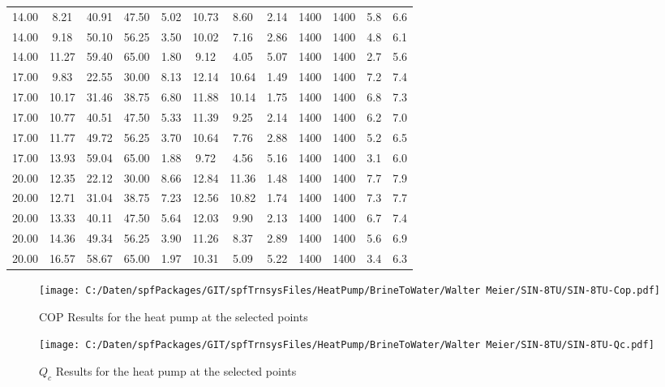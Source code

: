 \documentclass[english]{SPFShortReport}
\begin{document}
\begin{table}[!ht]
\begin{small}
\begin{center}
{\begin{tabular}{l | c c c c c c c c c c c }
14.00 & 8.21 & 40.91 & 47.50 & 5.02 & 10.73 & 8.60 & 2.14 & 1400 & 1400 & 5.8 & 6.6\\ 
14.00 & 9.18 & 50.10 & 56.25 & 3.50 & 10.02 & 7.16 & 2.86 & 1400 & 1400 & 4.8 & 6.1\\ 
14.00 & 11.27 & 59.40 & 65.00 & 1.80 & 9.12 & 4.05 & 5.07 & 1400 & 1400 & 2.7 & 5.6\\ 
17.00 & 9.83 & 22.55 & 30.00 & 8.13 & 12.14 & 10.64 & 1.49 & 1400 & 1400 & 7.2 & 7.4\\ 
17.00 & 10.17 & 31.46 & 38.75 & 6.80 & 11.88 & 10.14 & 1.75 & 1400 & 1400 & 6.8 & 7.3\\ 
17.00 & 10.77 & 40.51 & 47.50 & 5.33 & 11.39 & 9.25 & 2.14 & 1400 & 1400 & 6.2 & 7.0\\ 
17.00 & 11.77 & 49.72 & 56.25 & 3.70 & 10.64 & 7.76 & 2.88 & 1400 & 1400 & 5.2 & 6.5\\ 
17.00 & 13.93 & 59.04 & 65.00 & 1.88 & 9.72 & 4.56 & 5.16 & 1400 & 1400 & 3.1 & 6.0\\ 
20.00 & 12.35 & 22.12 & 30.00 & 8.66 & 12.84 & 11.36 & 1.48 & 1400 & 1400 & 7.7 & 7.9\\ 
20.00 & 12.71 & 31.04 & 38.75 & 7.23 & 12.56 & 10.82 & 1.74 & 1400 & 1400 & 7.3 & 7.7\\ 
20.00 & 13.33 & 40.11 & 47.50 & 5.64 & 12.03 & 9.90 & 2.13 & 1400 & 1400 & 6.7 & 7.4\\ 
20.00 & 14.36 & 49.34 & 56.25 & 3.90 & 11.26 & 8.37 & 2.89 & 1400 & 1400 & 5.6 & 6.9\\ 
20.00 & 16.57 & 58.67 & 65.00 & 1.97 & 10.31 & 5.09 & 5.22 & 1400 & 1400 & 3.4 & 6.3\\ 
\hline
\hline
\end{tabular}
}
\label{ResultsTable}
\end{center}
\end{small}
\end{table}
\begin{figure}[!ht]
\begin{center}
\texttt{[image: C:/Daten/spfPackages/GIT/spfTrnsysFiles/HeatPump/BrineToWater/Walter Meier/SIN-8TU/SIN-8TU-Cop.pdf]}
\caption{COP Results for the heat pump at the selected points}
\label{COPFig}
\end{center}
\end{figure}
\begin{figure}[!ht]
\begin{center}
\texttt{[image: C:/Daten/spfPackages/GIT/spfTrnsysFiles/HeatPump/BrineToWater/Walter Meier/SIN-8TU/SIN-8TU-Qc.pdf]}
\caption{$Q_c$ Results for the heat pump at the selected points}
\label{QcFig}
\end{center}
\end{figure}
\end{document}
